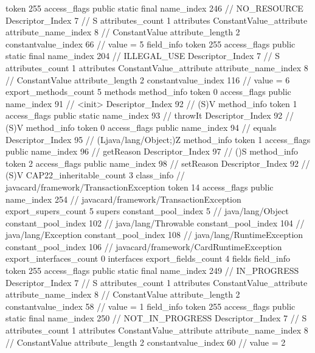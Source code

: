 {{{{{				token	255
				access_flags	public static final
				name_index	246		// NO_RESOURCE
				Descriptor_Index	7		// S
				attributes_count	1
				attributes {
				ConstantValue_attribute {
					attribute_name_index	8		// ConstantValue
					attribute_length	2
					constantvalue_index	66		// value = 5
				}
				}
			}
			field_info {
				token	255
				access_flags	public static final
				name_index	204		// ILLEGAL_USE
				Descriptor_Index	7		// S
				attributes_count	1
				attributes {
				ConstantValue_attribute {
					attribute_name_index	8		// ConstantValue
					attribute_length	2
					constantvalue_index	116		// value = 6
				}
				}
			}
			}
			export_methods_count	5
			methods {
				method_info {
					token	0
					access_flags	public
					name_index	91		// <init>
					Descriptor_Index	92		// (S)V
				}
				method_info {
					token	1
					access_flags	public static
					name_index	93		// throwIt
					Descriptor_Index	92		// (S)V
				}
				method_info {
					token	0
					access_flags	public
					name_index	94		// equals
					Descriptor_Index	95		// (Ljava/lang/Object;)Z
				}
				method_info {
					token	1
					access_flags	public
					name_index	96		// getReason
					Descriptor_Index	97		// ()S
				}
				method_info {
					token	2
					access_flags	public
					name_index	98		// setReason
					Descriptor_Index	92		// (S)V
				}
			}
			CAP22_inheritable_count	3
		}
		class_info {		// javacard/framework/TransactionException
			token	14
			access_flags	public
			name_index	254		// javacard/framework/TransactionException
			export_supers_count	5
			supers {
				constant_pool_index	5		// java/lang/Object
				constant_pool_index	102		// java/lang/Throwable
				constant_pool_index	104		// java/lang/Exception
				constant_pool_index	108		// java/lang/RuntimeException
				constant_pool_index	106		// javacard/framework/CardRuntimeException
			}
			export_interfaces_count	0
			interfaces {
			}
			export_fields_count	4
			fields {
			field_info {
				token	255
				access_flags	public static final
				name_index	249		// IN_PROGRESS
				Descriptor_Index	7		// S
				attributes_count	1
				attributes {
				ConstantValue_attribute {
					attribute_name_index	8		// ConstantValue
					attribute_length	2
					constantvalue_index	58		// value = 1
				}
				}
			}
			field_info {
				token	255
				access_flags	public static final
				name_index	250		// NOT_IN_PROGRESS
				Descriptor_Index	7		// S
				attributes_count	1
				attributes {
				ConstantValue_attribute {
					attribute_name_index	8		// ConstantValue
					attribute_length	2
					constantvalue_index	60		// value = 2
}}}}}}}
